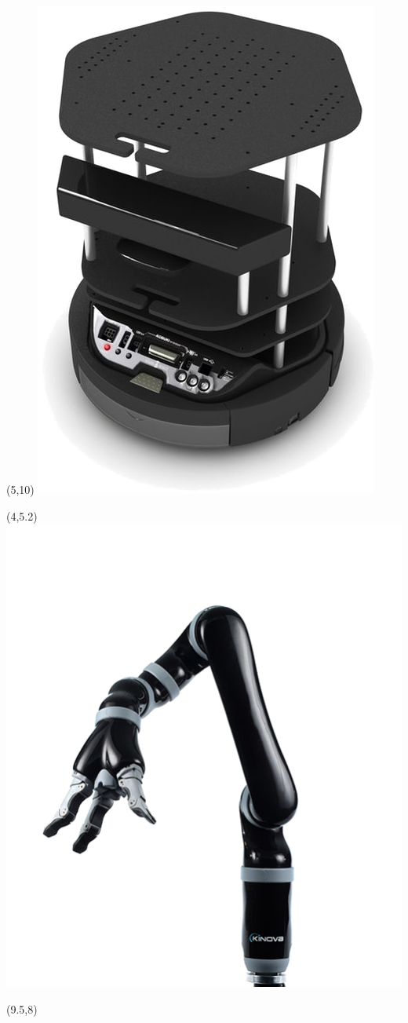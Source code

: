 \documentclass{beamer}
\begin{document}
         \begin{frame}[plain]{}
             \begin{textblock}{5}(5,10)
                 \includegraphics[width=0.5\linewidth]{figures/platform.png}
                \end{textblock}
                \begin{textblock}{5}(4,5.2)
                    \includegraphics[width=0.7\linewidth]{figures/robot_arm.png}
                \end{textblock}
                \begin{textblock}{5}(9.5,8)

\end{textblock}
\end{frame}
\end{document}
